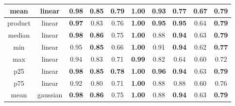 \begin{table*}[!b]
\begin{tabular}{|c|c|c|c|c|c|c|c|c|c|}
        \hline
                   mean &          linear &            \textbf{0.98} &                 \textbf{0.85} &           \textbf{0.79} &          \textbf{1.00} &                        0.93 &                        0.77 &          \textbf{0.67} &               \textbf{0.79} \\
        \hline
                product &          linear &            \textbf{0.97} &                          0.83 &                    0.76 &          \textbf{1.00} &               \textbf{0.95} &               \textbf{0.95} &                   0.64 &               \textbf{0.79} \\
        \hline
                 median &          linear &            \textbf{0.98} &                 \textbf{0.86} &                    0.75 &          \textbf{1.00} &                        0.88 &               \textbf{0.94} &                   0.63 &               \textbf{0.79} \\
        \hline
                    min &          linear &                     0.95 &                 \textbf{0.85} &                    0.66 &          \textbf{1.00} &                        0.91 &               \textbf{0.94} &                   0.62 &               \textbf{0.77} \\
        \hline
                    max &          linear &                     0.94 &                          0.83 &                    0.71 &          \textbf{0.99} &                        0.82 &                        0.64 &                   0.60 &                        0.72 \\
        \hline
                    p25 &          linear &            \textbf{0.98} &                 \textbf{0.85} &           \textbf{0.78} &          \textbf{1.00} &               \textbf{0.96} &               \textbf{0.94} &                   0.63 &               \textbf{0.79} \\
        \hline
                    p75 &          linear &                     0.92 &                          0.80 &                    0.71 &          \textbf{1.00} &                        0.88 &                        0.88 &                   0.60 &                        0.76 \\
        \hline
                   mean &        gaussian &            \textbf{0.98} &                 \textbf{0.86} &                    0.75 &          \textbf{1.00} &                        0.88 &               \textbf{0.94} &                   0.63 &               \textbf{0.79} \\

\end{tabular}
\end{table*}
